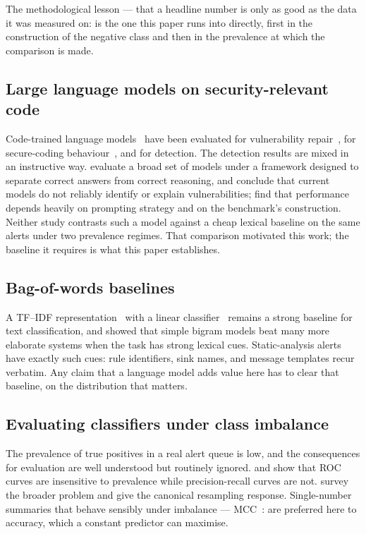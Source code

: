 \documentclass[journal]{IEEEtran}
\providecommand{\citep}[1]{\cite{#1}}
\providecommand{\citet}[1]{\cite{#1}}
\theoremstyle{definition}
\begin{document}
The methodological lesson --- that a headline number is only as good as the
data it was measured on: is the one this paper runs into directly, first in
the construction of the negative class and then in the prevalence at which the
comparison is made.

\subsection{Large language models on security-relevant code}

Code-trained language models~\citep{chen2021codex} have been evaluated for
vulnerability repair~\citep{pearce2023repair}, for secure-coding
behaviour~\citep{bhatt2023cyberseceval, siddiq2022securityeval}, and for
detection. The detection results are mixed in an instructive way.
\citet{ullah2024llmcannot} evaluate a broad set of models under a framework
designed to separate correct answers from correct reasoning, and conclude that
current models do not reliably identify or explain vulnerabilities;
\citet{khare2023understanding} find that performance depends heavily on prompting
strategy and on the benchmark's construction. Neither study contrasts such a model
against a cheap lexical baseline on the same alerts under two prevalence
regimes. That comparison motivated this work; the baseline it requires is what
this paper establishes.

\subsection{Bag-of-words baselines}

A TF--IDF representation~\citep{salton1988tfidf} with a linear
classifier~\citep{joachims1998svm} remains a strong baseline for text
classification, and \citet{wang2012baselines} showed that simple
bigram models beat many more elaborate systems when the task has strong lexical
cues. Static-analysis alerts have exactly such cues: rule identifiers, sink
names, and message templates recur verbatim. Any claim that a language model
adds value here has to clear that baseline, on the distribution that matters.

\subsection{Evaluating classifiers under class imbalance}

The prevalence of true positives in a real alert queue is low, and the
consequences for evaluation are well understood but routinely ignored.
\citet{davis2006prroc} and \citet{saito2015prplot} show that ROC curves are
insensitive to prevalence while precision-recall curves are not.
\citet{he2009imbalanced} survey the broader
problem and \citet{chawla2002smote} give the canonical resampling response.
Single-number summaries that behave sensibly under imbalance ---
MCC~\citep{matthews1975, chicco2020mcc}: are preferred here to accuracy,
which a constant predictor can maximise.
\end{document}

